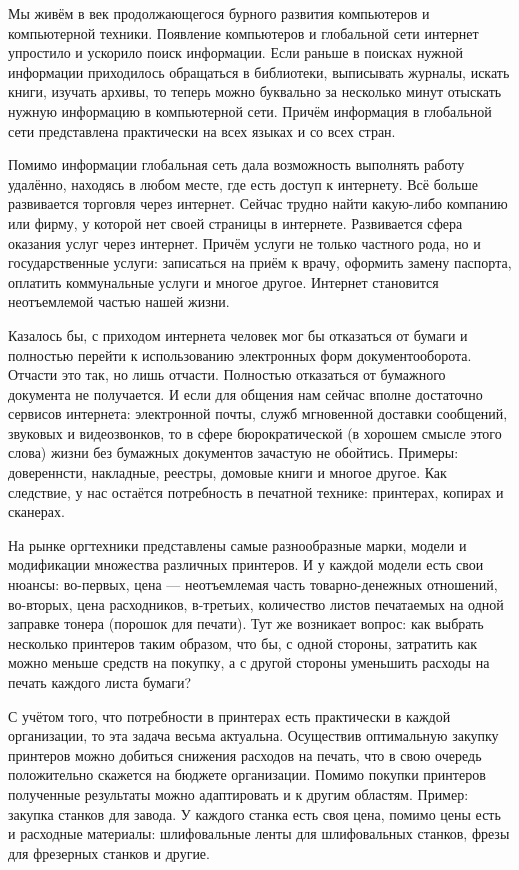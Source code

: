 
Мы живём в век продолжающегося бурного развития компьютеров и компьютерной техники. Появление компьютеров и глобальной сети интернет упростило и ускорило поиск информации. Если раньше в поисках нужной информации приходилось обращаться в библиотеки, выписывать журналы, искать книги, изучать архивы, то теперь можно буквально за несколько минут отыскать нужную информацию в компьютерной сети. Причём информация в глобальной сети представлена практически на всех языках и со всех стран.

Помимо информации глобальная сеть дала возможность выполнять работу удалённо, находясь в любом месте, где есть доступ к интернету. Всё больше развивается торговля через интернет. Сейчас трудно найти какую-либо компанию или фирму, у которой нет своей страницы в интернете. Развивается сфера оказания услуг через интернет. Причём услуги не только частного рода, но и государственные услуги: записаться на приём к врачу, оформить замену паспорта, оплатить коммунальные услуги и многое другое. Интернет становится неотъемлемой частью нашей жизни.

Казалось бы, с приходом интернета человек мог бы отказаться от бумаги и полностью перейти к использованию электронных форм документооборота. Отчасти это так, но лишь отчасти. Полностью отказаться от бумажного документа не получается. И если для общения нам сейчас вполне достаточно сервисов интернета: электронной почты, служб мгновенной доставки сообщений, звуковых и видеозвонков, то в сфере бюрократической (в хорошем смысле этого слова) жизни без бумажных документов зачастую не обойтись. Примеры: довереннсти, накладные, реестры, домовые книги и многое другое. Как следствие, у нас остаётся потребность в печатной технике: принтерах, копирах и сканерах.

На рынке оргтехники представлены самые разнообразные марки, модели и модификации множества различных принтеров. И у каждой модели есть свои нюансы: во-первых, цена --- неотъемлемая часть товарно-денежных отношений, во-вторых, цена расходников, в-третьих, количество листов печатаемых на одной заправке тонера (порошок для печати). Тут же возникает вопрос: как выбрать несколько принтеров таким образом, что бы, с одной стороны, затратить как можно меньше средств на покупку, а с другой стороны уменьшить расходы на печать каждого листа бумаги?

С учётом того, что потребности в принтерах есть практически в каждой организации, то эта задача весьма актуальна. Осуществив оптимальную закупку принтеров можно добиться снижения расходов на печать, что в свою очередь положительно скажется на бюджете организации. Помимо покупки принтеров полученные результаты можно адаптировать и к другим областям. Пример: закупка станков для завода. У каждого станка есть своя цена, помимо цены есть и расходные материалы: шлифовальные ленты для шлифовальных станков, фрезы для фрезерных станков и другие.

\pagebreak

